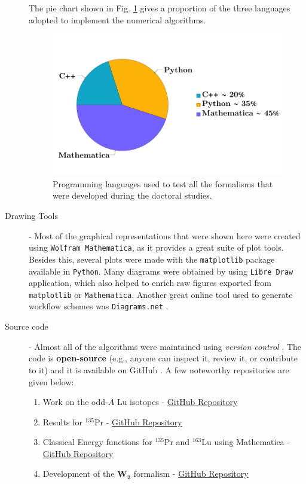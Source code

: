 \begin{description}
\begin{enumerate}
    \end{enumerate}
    The pie chart shown in Fig. \ref{programming-languages-model} gives a proportion of the three languages adopted to implement the numerical algorithms. 
        \begin{figure}
            \centering
            \includegraphics[scale=0.85]{Chapters/Figures/pieChartLanguages.pdf}
            \caption{Programming languages used to test all the formalisms that were developed during the doctoral studies.}
            \label{programming-languages-model}
        \end{figure} 
    \item[Drawing Tools] - Most of the graphical representations that were shown here were created using \texttt{Wolfram Mathematica}, as it provides a great suite of plot tools. Besides this, several plots were made with the \texttt{matplotlib} package \cite{Matplotlib} available in \texttt{Python}. Many diagrams were obtained by using \texttt{Libre Draw} \cite{LibreOffice} application, which also helped to enrich raw figures exported from \texttt{matplotlib} or \texttt{Mathematica}. Another great online tool used to generate workflow schemes was \texttt{Diagrams.net} \cite{diagrams.net}.
    \item[Source code] - Almost all of the algorithms were maintained using \emph{version control} \cite{Git}. The code is \textbf{open-source} (e.g., anyone can inspect it, review it, or contribute to it) and it is available on GitHub \cite{GitHub}. A few noteworthy repositories are given below:
    \begin{enumerate}
        \item Work on the odd-$A$ Lu isotopes - \href{https://github.com/basavyr/163Lu-New-TSD4-Formalism}{GitHub Repository}
        \item Results for $^{135}$Pr - \href{https://github.com/basavyr/pr135_EnergyFit_TW1TW2}{GitHub Repository}
        \item Classical Energy functions for $^{135}$Pr and $^{163}$Lu using Mathematica - \href{https://github.com/basavyr/mathematica-useful-algorithms}{GitHub Repository}
        \item Development of the $\mathbf{W_2}$ formalism - \href{https://github.com/basavyr/SymmetryPartners-RJP}{GitHub Repository}
    \end{enumerate}
\end{description}